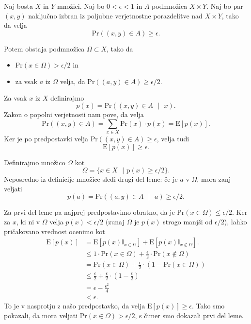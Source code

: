 \documentclass[isrm2, tisk]{fmfdelo}
\begin{document}
\begin{lema}
\label{lema:verjetnost}
    Naj bosta $X$ in $Y$ množici. Naj bo $0 < \epsilon < 1$ in $A$ podmnožica $X \times Y$. Naj bo
    par $(x, y)$ naključno izbran iz poljubne verjetnostne porazdelitve nad $X \times Y$, tako da
    velja
    $$
    \text{Pr}((x, y) \in A) \geq \epsilon.
    $$

    Potem obstaja podmnožica $\Omega \subset X$, tako da
    \begin{itemize}
        \item $\text{Pr}(x \in \Omega) > \epsilon / 2$ in
        \item za vsak $a$ iz $\Omega$ velja, da $\text{Pr}((a, y) \in A) \geq \epsilon / 2$.
    \end{itemize}
\end{lema}

\begin{dokaz}
    Za vsak $x$ iz $X$ definirajmo
    $$
    p(x) = \text{Pr}((x, y) \in A \text{ }|\text{ } x).
    $$
    Zakon o popolni verjetnosti nam pove, da velja
    $$
    \text{Pr}((x, y) \in A) = \sum_{x \in X} \text{Pr}(x) \cdot p(x) = \text{E}[p(x)].
    $$
    Ker je po predpostavki velja $\text{Pr}((x, y) \in A) \geq \epsilon$, velja tudi
    $$
    \text{E}[p(x)] \geq \epsilon.
    $$

    Definirajmo množico $\Omega$ kot
    $$
    \Omega = \{x \in X \text{ }|\text{ p}(x) \geq \epsilon / 2\}.
    $$
    Neposredno iz definicije množice sledi drugi del leme: če je $a$ v $\Omega$, mora zanj veljati
    $$
    p(a) = \text{Pr}((a, y) \in A \text{ }|\text{ } a) \geq \epsilon / 2.
    $$

    Za prvi del leme pa najprej predpostavimo obratno, da je $\text{Pr}(x \in \Omega) \leq \epsilon / 2$.
    Ker za $x$, ki ni v $\Omega$ velja $p(x) < \epsilon / 2$ (zunaj $\Omega$ je $p(x)$ strogo manjši
    od $\epsilon / 2$), lahko pričakovano vrednost ocenimo kot
    \begin{align*}
        \text{E}[p(x)] &= \text{E}[p(x) \mathbb{I}_{x \in \Omega}] + \text{E}[p(x) \mathbb{I}_{x \notin \Omega}]. \\
                       &\leq 1 \cdot \text{Pr}(x \in \Omega) + \frac{\epsilon}{2} \cdot \text{Pr}(x \notin \Omega) \\
                       &= \text{Pr}(x \in \Omega) + \frac{\epsilon}{2} \cdot (1 - \text{Pr}(x \in \Omega)) \\
                       &\leq \frac{\epsilon}{2} + \frac{\epsilon}{2} \cdot \left(1 - \frac{\epsilon}{2}\right) \\
                       &= \epsilon - \frac{\epsilon^2}{4} \\
                       &< \epsilon.
    \end{align*}
    To je v nasprotju z našo predpostavko, da velja $\text{E}[p(x)] \geq \epsilon$. Tako smo pokazali,
    da mora veljati $\text{Pr}(x \in \Omega) > \epsilon / 2$, s čimer smo dokazali prvi del leme.
\end{dokaz}
\end{document}
